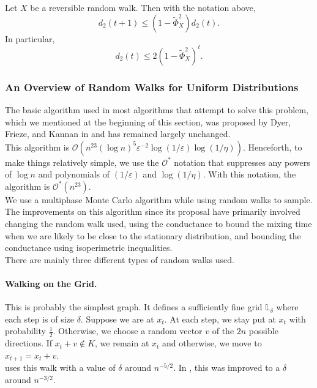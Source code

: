 \begin{ftheo}
\label{large conductance implies rapidly mixing}
Let $X$ be a reversible random walk. Then with the notation above,
\[ d_2(t+1) \leq (1-\tilde{\Phi}_X^2)d_2(t). \]
In particular,
\[ d_2(t) \leq 2(1-\tilde{\Phi}_X^2)^t. \]
\end{ftheo}

\subsubsection{An Overview of Random Walks for Uniform Distributions}
\label{sec: 4.2.4}

The basic algorithm used in most algorithms that attempt to solve this problem, which we mentioned at the beginning of this section, was proposed by Dyer, Frieze, and Kannan in \cite{dyer-frieze-kannan} and has remained largely unchanged.\\
This algorithm is $\mathcal{O}(n^{23}(\log n)^5\varepsilon^{-2}\log(1/\varepsilon)\log(1/\eta))$. Henceforth, to make things relatively simple, we use the $\mathcal{O}^*$ notation that suppresses any powers of $\log n$ and polynomials of $(1/\varepsilon)$ and $\log(1/\eta)$. With this notation, the algorithm is $\mathcal{O}^*(n^{23})$.\\

We use a multiphase Monte Carlo algorithm while using random walks to sample. The improvements on this algorithm since its proposal have primarily involved changing the random walk used, using the conductance to bound the mixing time when we are likely to be close to the stationary distribution, and bounding the conductance using isoperimetric inequalities.\\

There are mainly three different types of random walks used.

\paragraph{Walking on the Grid.}

This is probably the simplest graph. It defines a sufficiently fine grid $\mathbb{L}_\delta$ where each step is of size $\delta$. Suppose we are at $x_t$. At each step, we stay put at $x_t$ with probability $\frac{1}{2}$. Otherwise, we choose a random vector $v$ of the $2n$ possible directions. If $x_t+v\not\in K$, we remain at $x_t$ and otherwise, we move to $x_{t+1}=x_t+v$.\\
\cite{dyer-frieze-kannan} uses this walk with a value of $\delta$ around $n^{-5/2}$. In \cite{lovasz-simonovits-mixing-rate-isoperimetric}, this was improved to a $\delta$ around $n^{-3/2}$.

